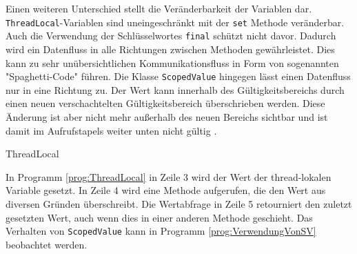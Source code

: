     Einen weiteren Unterschied stellt die Veränderbarkeit der Variablen dar. \texttt{Thread\-Local}-Variablen sind uneingeschränkt mit der \texttt{set} Methode veränderbar.
    Auch die Verwendung der Schlüsselwortes \texttt{final} schützt nicht davor. Dadurch wird ein Datenfluss in alle Richtungen zwischen Methoden gewährleistet. Dies kann zu sehr unübersichtlichen 
    Kommunikationsfluss in Form von sogenannten "Spaghetti-Code" führen. Die Klasse \texttt{ScopedValue} hingegen lässt einen Datenfluss nur in eine Richtung zu. Der Wert kann innerhalb des 
    Gültigkeitsbereichs durch einen neuen verschachtelten Gültigkeitsbereich überschrieben werden. Diese Änderung ist aber nicht mehr außerhalb des neuen Bereichs sichtbar und ist damit im Aufrufstapels weiter
    unten nicht gültig \cite{JEP481}.
    \begin{program} [H]
        \caption{ThreadLocal}
        \label{prog:ThreadLocal}
    \begin{JavaCode}[language=Java, numbers=left]
static ThreadLocal<String> threadLokal = new ThreadLocal<>();
public static void main(String[] args) {
    threadLokal.set("the negative side of Threadlocal");
    printHello();
    System.out.println(STR."This is a Methode to show \{threadLokal.get()}");
    threadLokal.remove();
}

public static void printHello() {
    threadLokal.set(Thread.currentThread().toString());
    System.out.println(STR."Hello from \{threadLokal.get()}");
}\end{JavaCode}
    \end{program}
    In Programm \ref{prog:ThreadLocal} in Zeile 3 wird der Wert der thread-lokalen Variable gesetzt. In Zeile 4 wird eine Methode aufgerufen, die den Wert aus diversen Gründen überschreibt. Die Wertabfrage in Zeile 5
    retourniert den zuletzt gesetzten Wert, auch wenn dies in einer anderen Methode geschieht. Das Verhalten von \texttt{ScopedValue} kann in Programm \ref{prog:VerwendungVonSV} beobachtet werden.


